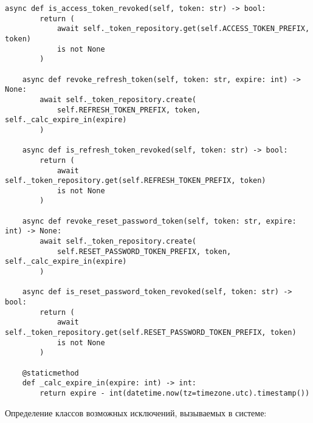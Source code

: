 \begin{lstlisting}[style=pythonstyle]
    async def is_access_token_revoked(self, token: str) -> bool:
        return (
            await self._token_repository.get(self.ACCESS_TOKEN_PREFIX, token)
            is not None
        )

    async def revoke_refresh_token(self, token: str, expire: int) -> None:
        await self._token_repository.create(
            self.REFRESH_TOKEN_PREFIX, token, self._calc_expire_in(expire)
        )

    async def is_refresh_token_revoked(self, token: str) -> bool:
        return (
            await self._token_repository.get(self.REFRESH_TOKEN_PREFIX, token)
            is not None
        )

    async def revoke_reset_password_token(self, token: str, expire: int) -> None:
        await self._token_repository.create(
            self.RESET_PASSWORD_TOKEN_PREFIX, token, self._calc_expire_in(expire)
        )

    async def is_reset_password_token_revoked(self, token: str) -> bool:
        return (
            await self._token_repository.get(self.RESET_PASSWORD_TOKEN_PREFIX, token)
            is not None
        )

    @staticmethod
    def _calc_expire_in(expire: int) -> int:
        return expire - int(datetime.now(tz=timezone.utc).timestamp())
\end{lstlisting}


\noindent
Определение классов возможных исключений, вызываемых в системе:

